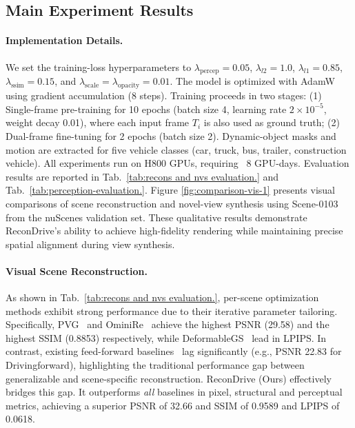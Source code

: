 \subsection{Main Experiment Results}
\paragraph{Implementation Details.} We set the training-loss hyperparameters to $\lambda_{\text{percep}}=0.05$, $\lambda_{l2}=1.0$, $\lambda_{l1}=0.85$, $\lambda_{\text{ssim}}=0.15$, and $\lambda_{\text{scale}}=\lambda_{\text{opacity}}=0.01$. The model is optimized with AdamW using gradient accumulation (8 steps). Training proceeds in two stages: (1) Single-frame pre-training for 10 epochs (batch size 4, learning rate $2\times10^{-5}$, weight decay 0.01), where each input frame $T_i$ is also used as ground truth; (2) Dual-frame fine-tuning for 2 epochs (batch size 2). Dynamic-object masks and motion are extracted for five vehicle classes (car, truck, bus, trailer, construction vehicle). All experiments run on H800 GPUs, requiring ~8 GPU-days. Evaluation results are reported in Tab.~\ref{tab:recons and nvs evaluation.} and Tab.~\ref{tab:perception-evaluation.}.
Figure \ref{fig:comparison-vis-1} presents visual comparisons of scene reconstruction and novel-view synthesis using Scene-0103 from the nuScenes validation set. These qualitative results demonstrate ReconDrive's ability to achieve high-fidelity rendering while maintaining precise spatial alignment during view synthesis.

\paragraph{Visual Scene Reconstruction.} As shown in Tab.~\ref{tab:recons and nvs evaluation.}, per-scene optimization methods exhibit strong performance due to their iterative parameter tailoring. Specifically, PVG~\cite{chen2023periodic} and OminiRe~\cite{chen2025omnire} achieve the highest PSNR (29.58) and the highest SSIM (0.8853) respectively, while DeformableGS~\cite{yang2024deformable} lead in LPIPS. In contrast, existing feed-forward baselines~\cite{tian2025drivingforward} lag significantly (e.g., PSNR 22.83 for Drivingforward), highlighting the traditional performance gap between generalizable and scene-specific reconstruction.
ReconDrive (Ours) effectively bridges this gap. It outperforms \textit{all} baselines in pixel, structural and perceptual metrics, achieving a superior PSNR of 32.66 and SSIM of 0.9589 and LPIPS of 0.0618. 

